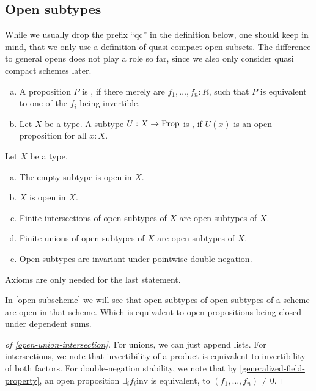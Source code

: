 \subsection{Open subtypes}

While we usually drop the prefix ``qc'' in the definition below,
one should keep in mind, that we only use a definition of quasi compact open subsets.
The difference to general opens does not play a role so far,
since we also only consider quasi compact schemes later.

\begin{definition}%
  \label{qc-open}
  \begin{enumerate}[(a)]
  \item A proposition $P$ is , if there merely are $f_1,\dots,f_n:R$,
    such that $P$ is equivalent to one of the $f_i$ being invertible.
  \item Let $X$ be a type.
    A subtype $U:X\to\mathrm{Prop}$ is , if $U(x)$ is an open proposition for all $x:X$.
  \end{enumerate}
\end{definition}

\begin{proposition}%
  \label{open-union-intersection}
  Let $X$ be a type.
  \begin{enumerate}[(a)]
  \item The empty subtype is open in $X$.
  \item $X$ is open in $X$.
  \item Finite intersections of open subtypes of $X$ are open subtypes of $X$.
  \item Finite unions of open subtypes of $X$ are open subtypes of $X$.
  \item Open subtypes are invariant under pointwise double-negation.
  \end{enumerate}
  Axioms are only needed for the last statement.
\end{proposition}

In \cref{open-subscheme} we will see that open subtypes of open subtypes of a scheme are open in that scheme.
Which is equivalent to open propositions being closed under dependent sums.

\begin{proof}[of \cref{open-union-intersection}]
  For unions, we can just append lists.
  For intersections, we note that invertibility of a product
  is equivalent to invertibility of both factors.
  For double-negation stability,
  we note that by \cref{generalized-field-property},
  an open proposition $\exists_i f_i \mathrm{inv}$ is equivalent,
  to $(f_1,\dots,f_n)\neq 0$.
\end{proof}

